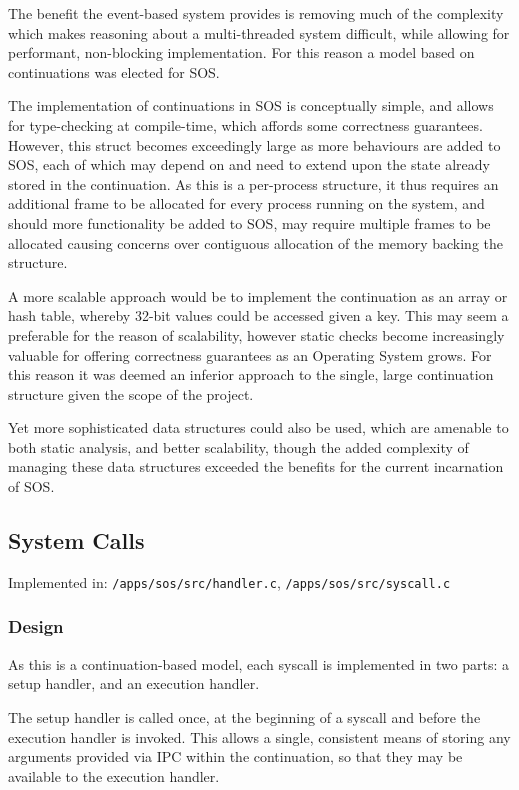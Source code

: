 \documentclass[a4paper,12pt]{article}
\begin{document}
The benefit the event-based system provides is removing much of the complexity
which makes reasoning about a multi-threaded system difficult, while allowing
for performant, non-blocking implementation.  For this reason a model based on
continuations was elected for SOS.

The implementation of continuations in SOS is conceptually simple, and allows
for type-checking at compile-time, which affords some correctness guarantees.
However, this struct becomes exceedingly large as more behaviours are added to
SOS, each of which may depend on and need to extend upon the state already
stored in the continuation.  As this is a per-process structure, it thus
requires an additional frame to be allocated for every process running on the
system, and should more functionality be added to SOS, may require multiple
frames to be allocated causing concerns over contiguous allocation of the
memory backing the structure.

A more scalable approach would be to implement the continuation as an array or
hash table, whereby 32-bit values could be accessed given a key.  This may
seem a preferable for the reason of scalability, however static checks become
increasingly valuable for offering correctness guarantees as an Operating
System grows.  For this reason it was deemed an inferior approach to the
single, large continuation structure given the scope of the project.

Yet more sophisticated data structures could also be used, which are amenable
to both static analysis, and better scalability, though the added complexity
of managing these data structures exceeded the benefits for the current
incarnation of SOS.

\subsection{System Calls}
Implemented in: \texttt{/apps/sos/src/handler.c}, \texttt{/apps/sos/src/syscall.c}

\subsubsection{Design}
As this is a continuation-based model, each syscall is implemented in two
parts: a setup handler, and an execution handler.

The setup handler is called once, at the beginning of a syscall and before the
execution handler is invoked.  This allows a single, consistent means of
storing any arguments provided via IPC within the continuation, so that they
may be available to the execution handler.
\end{document}
